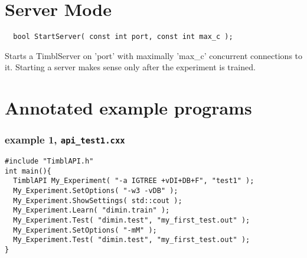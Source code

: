 \documentclass{report}
\begin{document}
\chapter{Server Mode}
\label{Using TiMBL as a Server}

\begin{footnotesize}
\begin{verbatim}
  bool StartServer( const int port, const int max_c );
\end{verbatim}
\end{footnotesize}

Starts a TimblServer on 'port' with maximally 'max\_c' concurrent
connections to it. Starting a server makes sense only after the
experiment is trained.

\clearpage
\chapter{Annotated example programs}

\subsection{example 1, {\tt api\_test1.cxx}}
\begin{footnotesize}
\begin{verbatim}	
#include "TimblAPI.h"
int main(){
  TimblAPI My_Experiment( "-a IGTREE +vDI+DB+F", "test1" );
  My_Experiment.SetOptions( "-w3 -vDB" );
  My_Experiment.ShowSettings( std::cout );
  My_Experiment.Learn( "dimin.train" );  
  My_Experiment.Test( "dimin.test", "my_first_test.out" );  
  My_Experiment.SetOptions( "-mM" );
  My_Experiment.Test( "dimin.test", "my_first_test.out" );  
}
\end{verbatim}
\end{footnotesize}
\end{document}
